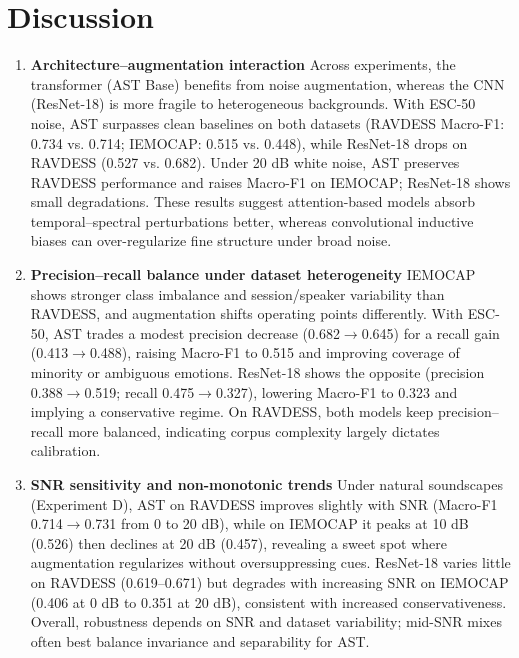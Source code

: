 
\chapter{Discussion}

\begin{enumerate}
    \item \textbf{Architecture–augmentation interaction} Across experiments, the transformer (AST Base) benefits from noise augmentation, whereas the CNN (ResNet-18) is more fragile to heterogeneous backgrounds. With ESC-50 noise, AST surpasses clean baselines on both datasets (RAVDESS Macro-F1: 0.734 vs. 0.714; IEMOCAP: 0.515 vs. 0.448), while ResNet-18 drops on RAVDESS (0.527 vs. 0.682). Under 20 dB white noise, AST preserves RAVDESS performance and raises Macro-F1 on IEMOCAP; ResNet-18 shows small degradations. These results suggest attention-based models absorb temporal–spectral perturbations better, whereas convolutional inductive biases can over-regularize fine structure under broad noise.

    \item \textbf{Precision–recall balance under dataset heterogeneity} IEMOCAP shows stronger class imbalance and session/speaker variability than RAVDESS, and augmentation shifts operating points differently. With ESC-50, AST trades a modest precision decrease (0.682$\to$0.645) for a recall gain (0.413$\to$0.488), raising Macro-F1 to 0.515 and improving coverage of minority or ambiguous emotions. ResNet-18 shows the opposite (precision 0.388$\to$0.519; recall 0.475$\to$0.327), lowering Macro-F1 to 0.323 and implying a conservative regime. On RAVDESS, both models keep precision–recall more balanced, indicating corpus complexity largely dictates calibration.

    \item \textbf{SNR sensitivity and non-monotonic trends} Under natural soundscapes (Experiment D), AST on RAVDESS improves slightly with SNR (Macro-F1 0.714$\to$0.731 from 0 to 20 dB), while on IEMOCAP it peaks at 10 dB (0.526) then declines at 20 dB (0.457), revealing a sweet spot where augmentation regularizes without oversuppressing cues. ResNet-18 varies little on RAVDESS (0.619–0.671) but degrades with increasing SNR on IEMOCAP (0.406 at 0 dB to 0.351 at 20 dB), consistent with increased conservativeness. Overall, robustness depends on SNR and dataset variability; mid-SNR mixes often best balance invariance and separability for AST.
\end{enumerate}